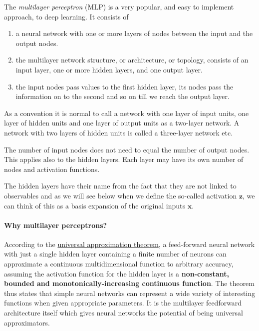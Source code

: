 \documentclass[%
oneside,                 %
final,                   %
10pt]{article}
\begin{document}
The \emph{multilayer perceptron} (MLP) is a very popular, and easy to implement approach, to deep learning. It consists of
\begin{enumerate}
\item a neural network with one or more layers of nodes between the input and the output nodes.

\item the multilayer network structure, or architecture, or topology, consists of an input layer, one or more hidden layers, and one output layer.

\item the input nodes pass values to the first hidden layer, its nodes pass the information on to the second and so on till we reach the output layer.
\end{enumerate}

\noindent
As a convention it is normal to call a network with one layer of input units, one layer of hidden units and one layer of output units as  a two-layer network. A network with two layers of hidden units is called a three-layer network etc.

The number of input nodes does not need to equal the number of output
nodes. This applies also to the hidden layers. Each layer may have its
own number of nodes and activation functions.

The hidden layers have their name from the fact that they are not
linked to observables and as we will see below when we define the
so-called activation $\boldsymbol{z}$, we can think of this as a basis
expansion of the original inputs $\boldsymbol{x}$. 

\paragraph{Why multilayer perceptrons?}
According to the \href{{http://citeseerx.ist.psu.edu/viewdoc/download?doi=10.1.1.441.7873&rep=rep1&type=pdf}}{universal approximation
theorem}, a feed-forward
neural network with just a single hidden layer containing a finite
number of neurons can approximate a continuous multidimensional
function to arbitrary accuracy, assuming the activation function for
the hidden layer is a \textbf{non-constant, bounded and
monotonically-increasing continuous function}. The theorem thus
states that simple neural networks can represent a wide variety of
interesting functions when given appropriate parameters. It is the
multilayer feedforward architecture itself which gives neural networks
the potential of being universal approximators.
\end{document}
